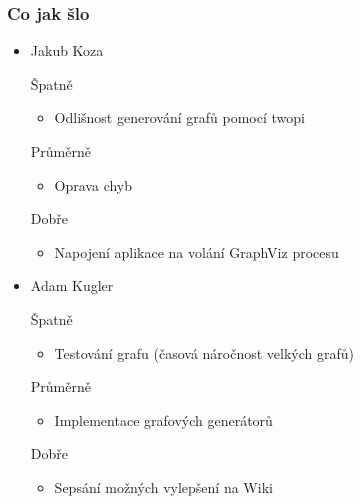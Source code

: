 \documentclass{beamer}
\begin{document}
\begin{frame}[allowframebreaks]\frametitle{Co jak šlo}
  \begin{itemize}
    \item Jakub Koza
     \begin{block}{Špatně} %
       \begin{itemize}
        \item Odlišnost generování grafů pomocí twopi
       \end{itemize}
     \end{block}
     \begin{block}{Průměrně} %
        \begin{itemize}
        \item Oprava chyb
       \end{itemize}
     \end{block}
     \begin{block}{Dobře} %
       \begin{itemize}
        \item Napojení aplikace na volání GraphViz procesu
       \end{itemize}
     \end{block}
   
    \item Adam Kugler
      \begin{block}{Špatně} %
       \begin{itemize}
        \item Testování grafu (časová náročnost velkých grafů)
       \end{itemize}
     \end{block}
     \begin{block}{Průměrně} %
        \begin{itemize}
        \item Implementace grafových generátorů
       \end{itemize}
     \end{block}
     \begin{block}{Dobře} %
       \begin{itemize}
        \item Sepsání možných vylepšení na Wiki
       \end{itemize}
     \end{block}
  

\end{itemize}
\end{frame}
\end{document}
